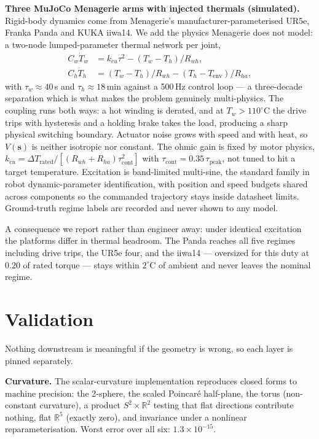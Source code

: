 \documentclass[11pt]{article}
\newcommand{\s}{\bm{s}}
\begin{document}
\textbf{Three MuJoCo Menagerie arms with injected thermals (simulated).}
Rigid-body dynamics come from Menagerie's manufacturer-parameterised UR5e,
Franka Panda and KUKA iiwa14. We add the physics Menagerie does not model: a
two-node lumped-parameter thermal network per joint,
\begin{align}
  C_w \dot T_w &= k_{cu}\tau^2 - (T_w-T_h)/R_{wh}, \\
  C_h \dot T_h &= (T_w-T_h)/R_{wh} - (T_h-T_{\mathrm{env}})/R_{ha},
\end{align}
with $\tau_w\!\approx\!40$\,s and $\tau_h\!\approx\!18$\,min against a 500\,Hz
control loop --- a three-decade separation which is what makes the problem
genuinely multi-physics. The coupling runs both ways: a hot winding is derated,
and at $T_w>110^\circ$C the drive trips with hysteresis and a holding brake
takes the load, producing a sharp physical switching boundary. Actuator noise
grows with speed and with heat, so $V(\s)$ is neither isotropic nor constant.
The ohmic gain is fixed by motor physics, $k_{cu}=\Delta
T_{\mathrm{rated}}/[(R_{wh}+R_{ha})\tau_{\mathrm{cont}}^2]$ with
$\tau_{\mathrm{cont}}=0.35\,\tau_{\mathrm{peak}}$, not tuned to hit a target
temperature. Excitation is band-limited multi-sine, the standard family in
robot dynamic-parameter identification, with position and speed budgets shared
across components so the commanded trajectory stays inside datasheet limits.
Ground-truth regime labels are recorded and never shown to any model.

A consequence we report rather than engineer away: under identical excitation
the platforms differ in thermal headroom. The Panda reaches all five regimes
including drive trips, the UR5e four, and the iiwa14 --- oversized for this
duty at $0.20$ of rated torque --- stays within $2^\circ$C of ambient and never
leaves the nominal regime.

\section{Validation}
\label{sec:validation}

Nothing downstream is meaningful if the geometry is wrong, so each layer is
pinned separately.

\textbf{Curvature.} The scalar-curvature implementation reproduces closed forms
to machine precision: the 2-sphere, the scaled Poincar\'e half-plane, the torus
(non-constant curvature), a product $S^2\times\mathbb{R}^2$ testing that flat
directions contribute nothing, flat $\mathbb{R}^5$ (exactly zero), and
invariance under a nonlinear reparameterisation. Worst error over all six:
$1.3\times10^{-15}$.
\end{document}
